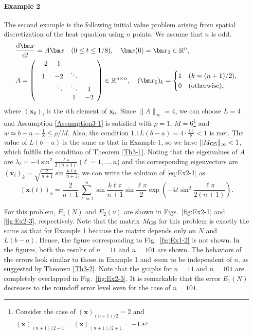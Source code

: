 \documentclass[pdflatex,sn-mathphys-num]{sn-jnl}%
\theoremstyle{thmstyleone}%
\theoremstyle{thmstyletwo}%
\theoremstyle{thmstylethree}%
\begin{document}
\paragraph{Example 2}
The second example is the following initial value problem arising from spatial discretization of the heat equation using $n$ points. We assume that $n$ is odd.
\begin{align}
& \frac{{\rm d}{\bm x}}{{\rm d}t}=A{\bm x} \quad (0\le t\le 1/8), \quad {\bm x}(0)={\bm x}_0 \in\mathbb{R}^n, \nonumber \\
& A=\left(
\begin{array}{cccc}
-2 & 1 & & \\
1 & -2 & \ddots & \\
& \ddots & \ddots & 1 \\
& & 1 & -2
\end{array}
\right) \in\mathbb{R}^{n\times n}, \quad
({\bm x}_0)_k= \begin{cases}
1 & (k=(n+1)/2), \\
0 & \mbox{(otherwise)},
\end{cases}
\label{eq:Ex2-1}
\end{align}
where $({\bm x}_0)_i$ is the $i$th element of ${\bm x}_0$. Since $\|A\|_{\infty}=4$, we can choose $L=4$ and Assumption \ref{Assumption3-1} is satisfied with $\rho=1$, $M=6$\footnote{Consider the case of $({\bm x})_{(n+1)/2}=2$ and $({\bm x})_{(n+1)/2-1}=({\bm x})_{(n+1)/2+1}=-1$.} and $w\simeq b-a=\frac{1}{8}\le \rho/M$. Also, the condition $1.1L(b-a)=4\cdot\frac{1.1}{8}<1$ is met. The value of $L(b-a)$ is the same as that in Example 1, so we have $\|M_{\rm GS}\|_{\infty}<1$, which fulfills the condition of Theorem \ref{Th3-1}. Noting that the eigenvalues of $A$ are $\lambda_{\ell}=-4\sin^2\frac{\ell\pi}{2(n+1)}$ ($\ell=1,\ldots,n$) and the corresponding eigenvectors are $({\bm v}_{\ell})_k=\sqrt{\frac{2}{n+1}}\sin\frac{k\ell\pi}{n+1}$, we can write the solution of \eqref{eq:Ex2-1} as
\begin{equation}
({\bm x}(t))_k=\frac{2}{n+1}\sum_{\ell=1}^n\sin\frac{k\ell\pi}{n+1}\sin\frac{\ell\pi}{2}\exp\left(-4t\sin^2\frac{\ell\pi}{2(n+1)}\right).
\end{equation}

For this problem, $E_1(N)$ and $E_2(\nu)$ are shown in Figs.~\ref{fig:Ex2-1} and \ref{fig:Ex2-3}, respectively. Note that the matrix $M_{\rm GS}$ for this problem is exactly the same as that for Example 1 because the matrix depends only on $N$ and $L(b-a)$. Hence, the figure corresponding to Fig.~\ref{fig:Ex1-2} is not shown. In the figures, both the results of $n=11$ and $n=101$ are shown. The behaviors of the errors look similar to those in Example 1 and seem to be independent of $n$, as suggested by Theorem \ref{Th3-2}. Note that the graphs for $n=11$ and $n=101$ are completely overlapped in Fig.~\ref{fig:Ex2-3}. It is remarkable that the error $E_1(N)$ decreases to the roundoff error level even for the case of $n=101$.
\end{document}
